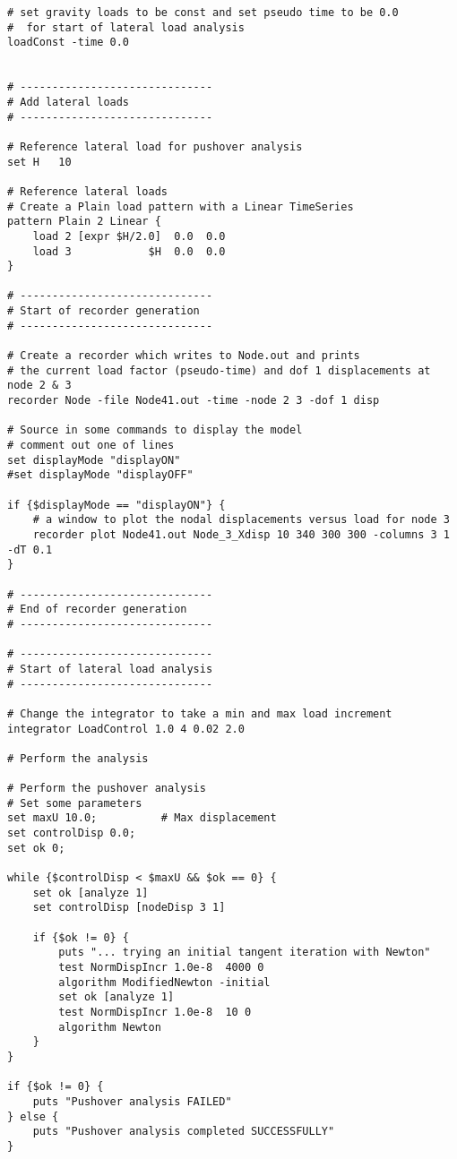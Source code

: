 \documentclass[12pt]{article}
\begin{document}
{\begin{verbatim}
# set gravity loads to be const and set pseudo time to be 0.0
#  for start of lateral load analysis
loadConst -time 0.0


# ------------------------------
# Add lateral loads 
# ------------------------------

# Reference lateral load for pushover analysis
set H   10

# Reference lateral loads
# Create a Plain load pattern with a Linear TimeSeries
pattern Plain 2 Linear {
    load 2 [expr $H/2.0]  0.0  0.0
    load 3            $H  0.0  0.0
}

# ------------------------------
# Start of recorder generation
# ------------------------------

# Create a recorder which writes to Node.out and prints
# the current load factor (pseudo-time) and dof 1 displacements at node 2 & 3
recorder Node -file Node41.out -time -node 2 3 -dof 1 disp

# Source in some commands to display the model
# comment out one of lines
set displayMode "displayON"
#set displayMode "displayOFF"

if {$displayMode == "displayON"} {
    # a window to plot the nodal displacements versus load for node 3
    recorder plot Node41.out Node_3_Xdisp 10 340 300 300 -columns 3 1 -dT 0.1
}

# ------------------------------
# End of recorder generation
# ------------------------------

# ------------------------------
# Start of lateral load analysis
# ------------------------------

# Change the integrator to take a min and max load increment
integrator LoadControl 1.0 4 0.02 2.0

# Perform the analysis

# Perform the pushover analysis
# Set some parameters
set maxU 10.0;	        # Max displacement
set controlDisp 0.0;
set ok 0;

while {$controlDisp < $maxU && $ok == 0} {
    set ok [analyze 1]
    set controlDisp [nodeDisp 3 1]

    if {$ok != 0} {
        puts "... trying an initial tangent iteration with Newton"
        test NormDispIncr 1.0e-8  4000 0
        algorithm ModifiedNewton -initial
        set ok [analyze 1]
        test NormDispIncr 1.0e-8  10 0
        algorithm Newton
    }
}

if {$ok != 0} {
    puts "Pushover analysis FAILED"
} else {
    puts "Pushover analysis completed SUCCESSFULLY"
}
\end{verbatim}
}
\end{document}
